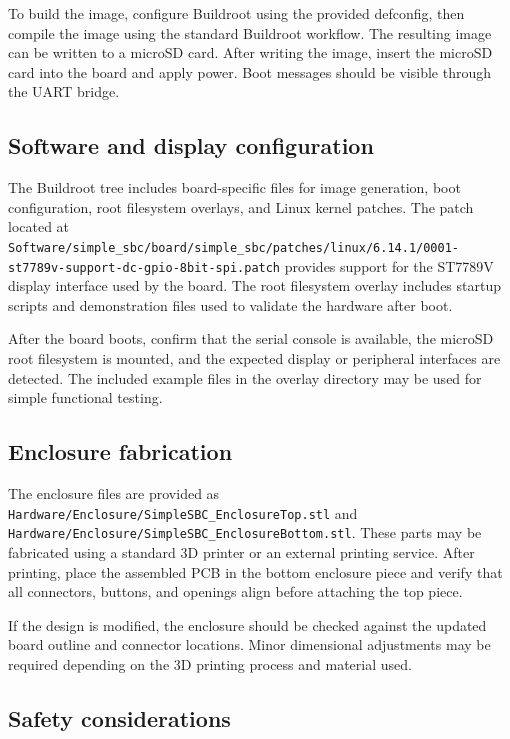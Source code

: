 To build the image, configure Buildroot using the provided defconfig, 
then compile the image using the standard Buildroot workflow. 
The resulting image can be written to a microSD card. After writing the image, 
insert the microSD card into the board and apply power. Boot messages should 
be visible through the UART bridge.

\subsection{Software and display configuration}

The Buildroot tree includes board-specific files for image generation, 
boot configuration, root filesystem overlays, and Linux kernel patches. 
The patch located at \texttt{Software/simple_sbc/board/simple_sbc/patches/linux/6.14.1/0001-st7789v-support-dc-gpio-8bit-spi.patch} 
provides support for the ST7789V display interface used by the board. 
The root filesystem overlay includes startup scripts and demonstration files 
used to validate the hardware after boot.

After the board boots, confirm that the serial console is available, the microSD 
root filesystem is mounted, and the expected display or peripheral interfaces are 
detected. The included example files in the overlay directory may be used for simple 
functional testing.

\subsection{Enclosure fabrication}

The enclosure files are provided as \texttt{Hardware/Enclosure/SimpleSBC_EnclosureTop.stl} 
and \texttt{Hardware/Enclosure/SimpleSBC_EnclosureBottom.stl}. 
These parts may be fabricated using a standard 3D printer or an external printing 
service. After printing, place the assembled PCB in the bottom enclosure piece and 
verify that all connectors, buttons, and openings align before attaching the top piece.

If the design is modified, the enclosure should be checked against the updated board 
outline and connector locations. Minor dimensional adjustments may be required depending 
on the 3D printing process and material used.

\subsection{Safety considerations}

